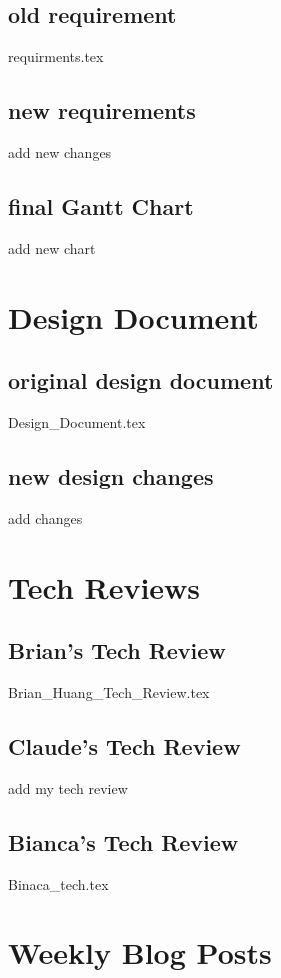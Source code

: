 \documentclass[onecolumn, draftclsnofoot,10pt, compsoc]{IEEEtran}
\begin{document}
		\subsection{old requirement}
			{requirments.tex}
			
		\subsection{new requirements}
			add new changes
		\subsection{final Gantt Chart}
			add new chart
		
	
		
	\section{Design Document}
		\subsection{original design document}
			{Design_Document.tex}
		\subsection{new design changes}
			add changes	
		
	\section{Tech Reviews}
		\subsection{Brian's Tech Review}
				{Brian_Huang_Tech_Review.tex}
		\subsection{Claude's Tech Review}
				add my tech review
		\subsection{Bianca's Tech Review}
				{Binaca_tech.tex}
				
	\section{Weekly Blog Posts}
	
\end{document}
